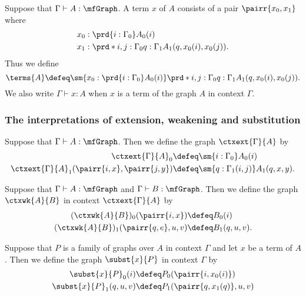 \begin{defn}
Suppose that $\Gamma\vdash A:\mfGraph$. A term $x$ of $A$ consists of a pair
$\pairr{x_0,x_1}$ where
\begin{align*}
x_0 & : \prd{i:\Gamma_0}A_0(i)\\
x_1 & : \prd*{i,j:\Gamma_0}{q:\Gamma_1}A_1(q,x_0(i),x_0(j)).
\end{align*}
Thus we define
\begin{equation*}
\terms{A}\defeq\sm{x_0:\prd{i:\Gamma_0}A_0(i)}\prd*{i,j:\Gamma_0}{q:\Gamma_1}A_1(q,x_0(i),x_0(j)).
\end{equation*}
We also write $\Gamma\vdash x:A$ when $x$ is a term of the graph $A$ in context
$\Gamma$.
\end{defn}

\subsubsection{The interpretations of extension, weakening and substitution}
\begin{defn}
Suppose that $\Gamma\vdash A:\mfGraph$. Then we define the graph $\ctxext{\Gamma}{A}$
by
\begin{align*}
\ctxext{\Gamma}{A}_0 & \defeq \sm{i:\Gamma_0}A_0(i)\\
\ctxext{\Gamma}{A}_1(\pairr{i,x},\pairr{j,y}) & \defeq \sm{q:\Gamma_1(i,j)}A_1(q,x,y).
\end{align*}
\end{defn}

\begin{defn}
Suppose that $\Gamma\vdash A:\mfGraph$ and $\Gamma\vdash B:\mfGraph$. Then we
define the graph $\ctxwk{A}{B}$ in context $\ctxext{\Gamma}{A}$ by
\begin{align*}
(\ctxwk{A}{B})_0(\pairr{i,x}) & \defeq B_0(i)\\
(\ctxwk{A}{B})_1(\pairr{q,e},u,v) & \defeq B_1(q,u,v).
\end{align*}
\end{defn}

\begin{defn}
Suppose that $P$ is a family of graphs over $A$ in context $\Gamma$ and let
$x$ be a term of $A$. Then we define the graph $\subst{x}{P}$ 
in context $\Gamma$ by
\begin{align*}
\subst{x}{P}_0(i) & \defeq P_0(\pairr{i,x_0(i)})\\
\subst{x}{P}_1(q,u,v) & \defeq P_1(\pairr{q,x_1(q)},u,v)
\end{align*}
\end{defn}

